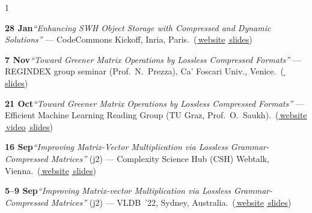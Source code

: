 \documentclass[10pt,a4paper,ragged2e,academicons]{altacv}
\newif\ifshortcv
\newcommand{\longonly}[1]{\ifshortcv\else#1\fi}%
\newcommand{\Lsep}{\;\textcolor{body!40}{\textbullet}\;}
\begin{document}
\begin{paracol}{1}
{\begin{talklist}
  \item \textbf{28 Jan}\enspace \textit{``Enhancing SWH Object Storage with Compressed and Dynamic Solutions''} --- CodeCommons Kickoff, Inria, Paris.\tinv\ {\footnotesize(\href{https://web.archive.org/web/20250318093619/https://hedgedoc.softwareheritage.org/cc_kickoff_workshops}{\faGlobe\,website} \Lsep \href{https://www.francescotosoni.it/static/slides_20250129.pdf}{\faFilePowerpoint\,slides})}
\end{talklist}

\longonly{%
\begin{talklist}
  \item \textbf{7 Nov}\enspace \textit{``Toward Greener Matrix Operations by Lossless Compressed Formats''} --- REGINDEX group seminar (Prof.~N.~Prezza), Ca' Foscari Univ., Venice.\tinv\ {\footnotesize(\href{https://www.francescotosoni.it/static/slides_20241021.pdf}{\faFilePowerpoint\,slides})}

  \item \textbf{21 Oct}\enspace \textit{``Toward Greener Matrix Operations by Lossless Compressed Formats''} --- Efficient Machine Learning Reading Group (TU Graz, Prof.~O.~Saukh).\tinv\tvir\ {\footnotesize(\href{https://sites.google.com/view/efficientml/home}{\faGlobe\,website} \Lsep \href{https://youtu.be/m5qgUGXhbi4?si=C6MNIM5_sTKSRtBt}{\faYoutube\,video} \Lsep \href{https://www.francescotosoni.it/static/slides_20241021.pdf}{\faFilePowerpoint\,slides})}
\end{talklist}

\yr{2022}
\begin{talklist}
  \item \textbf{16 Sep}\enspace \textit{``Improving Matrix-Vector Multiplication via Lossless Grammar-Compressed Matrices''} (j2) --- Complexity Science Hub (CSH) Webtalk, Vienna.\tinv\tvir\ {\footnotesize(\href{https://web.archive.org/web/20230528055208/https://www.csh.ac.at/event/csh-talk-francesco-tosoni-improving-matrix-vector-multiplication/}{\faGlobe\,website} \Lsep \href{https://www.francescotosoni.it/static/slides_20220916.pdf}{\faFilePowerpoint\,slides})}

  \item \textbf{5--9 Sep}\enspace \textit{``Improving Matrix-vector Multiplication via Lossless Grammar-Compressed Matrices''} (j2) --- VLDB~'22, Sydney, Australia.\tvir\ {\footnotesize(\href{https://vldb.org/2022}{\faGlobe\,website} \Lsep \href{https://www.francescotosoni.it/static/220907_VLDB_Research_2465.pdf}{\faFilePowerpoint\,slides})}


\end{talklist}}}
\end{paracol}
\end{document}
